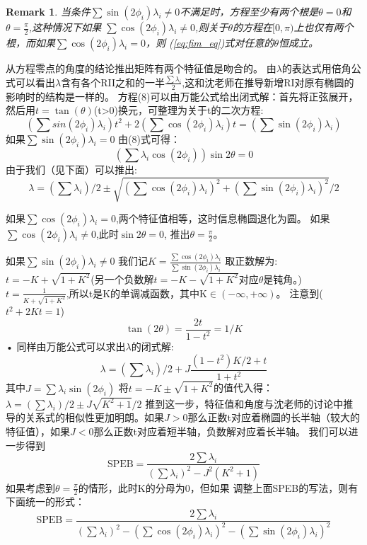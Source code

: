 \documentclass[12pt]{article}
\newtheorem{remark}[thm]{Remark}
\theoremstyle{remark}
\begin{document}
\begin{remark}
当条件$\sum \sin(2\phi_i)\lambda_i \neq 0$不满足时，方程至少有两个根是$\theta=0$和$\theta=\frac{\pi}{2}$,这种情况下如果
$\sum \cos(2\phi_i)\lambda_i \neq 0$,则关于$\theta$的方程在$[0,\pi)$上也仅有两个根，而如果$\sum \cos(2\phi_i)\lambda_i= 0$，则
(\ref{eq:fim_eq})式对任意的$\theta$恒成立。
\end{remark}
从方程零点的角度的结论推出矩阵有两个特征值是吻合的。
由$\lambda$的表达式用倍角公式可以看出$\lambda$含有各个RII之和的一半$\frac{\sum \lambda_i}{2}$,这和沈老师在推导新增RI对原有椭圆的影响时的结构是一样的。
方程(8)可以由万能公式给出闭式解：首先将正弦展开，然后用$t=\tan(\theta)$(t>0)换元，可整理为关于t的二次方程:
\begin{equation}\label{eq:Quad}
(\sum sin(2\phi_i)\lambda_i)t^2+2(\sum \cos(2\phi_i)\lambda_i)t=(\sum \sin(2\phi_i)\lambda_i)
\end{equation}
如果$\sum \sin(2\phi_i)\lambda_i = 0$
由(8)式可得：
\begin{equation}
(\sum \lambda_i \cos(2\phi_i))\sin 2\theta=0
\end{equation}
由于我们（见下面）可以推出:
\[
\lambda=(\sum \lambda_i)/2 \pm \sqrt{(\sum \cos(2\phi_i)\lambda_i)^2+(\sum \sin(2\phi_i)\lambda_i)^2}/2
\]

如果$\sum \cos(2\phi_i)\lambda_i = 0$,两个特征值相等，这时信息椭圆退化为圆。
如果$\sum \cos(2\phi_i)\lambda_i \neq 0$,此时$\sin 2\theta=0$,
推出$\theta=\frac{\pi}{2}$。

如果$\sum \sin(2\phi_i)\lambda_i \neq 0$
我们记$K=\frac{\sum \cos(2\phi_i)\lambda_i}{\sum \sin(2\phi_i)\lambda_i}$ 
取正数解为:$t=-K+\sqrt{1+K^2}$(另一个负数解$t=-K-\sqrt{1+K^2}$对应$\theta$是钝角。)
$t=\frac{1}{K+\sqrt{1+K^2}}$,所以t是K的单调减函数，其中K$\in (-\infty,+\infty)$。
注意到($t^2+2Kt=1$)
\begin{equation}\label{eq:Con}
\tan(2\theta)=\frac{2t}{1-t^2}=1/K
\end{equation}•
同样由万能公式可以求出$\lambda$的闭式解:
\begin{equation}
\lambda=(\sum \lambda_i)/2+J\frac{(1-t^2)K/2+t}{1+t^2}
\end{equation}
其中$J=\sum \lambda_i \sin(2\phi_i)$
将$t=-K \pm \sqrt{1+K^2}$的值代入得：
$\lambda=(\sum \lambda_i)/2 \pm J\sqrt{K^2+1}/2$
推到这一步，特征值和角度与沈老师的讨论中推导的关系式的相似性更加明朗。如果$J>0$那么正数t对应着椭圆的长半轴（较大的特征值），如果$J<0$那么正数t对应着短半轴，负数解对应着长半轴。
我们可以进一步得到
\begin{equation}\label{eq:SPEB}
\text{SPEB}=\frac{2\sum \lambda_i}{(\sum \lambda_i)^2-J^2(K^2+1)}
\end{equation}
如果考虑到$\theta=\frac{\pi}{2}$的情形，此时K的分母为0，但如果
调整上面SPEB的写法，则有下面统一的形式：
\begin{equation}
\label{eq:SPEB}
\text{SPEB}=\frac{2\sum \lambda_i}{(\sum \lambda_i)^2-(\sum \cos(2\phi_i)\lambda_i)^2-(\sum \sin(2\phi_i)\lambda_i)^2}
\end{equation}
\end{document}
